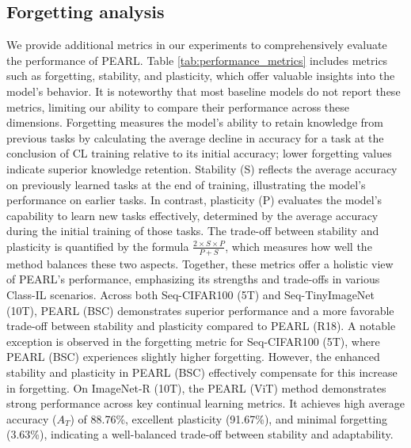 \documentclass[10pt]{article} %
\begin{document}
\subsection{Forgetting analysis}

We provide additional metrics in our experiments to comprehensively evaluate the performance of PEARL. Table \ref{tab:performance_metrics} includes metrics such as forgetting, stability, and plasticity, which offer valuable insights into the model's behavior. It is noteworthy that most baseline models do not report these metrics, limiting our ability to compare their performance across these dimensions. Forgetting measures the model's ability to retain knowledge from previous tasks by calculating the average decline in accuracy for a task at the conclusion of CL training relative to its initial accuracy; lower forgetting values indicate superior knowledge retention. Stability (S) reflects the average accuracy on previously learned tasks at the end of training, illustrating the model’s performance on earlier tasks. In contrast, plasticity (P) evaluates the model's capability to learn new tasks effectively, determined by the average accuracy during the initial training of those tasks. The trade-off between stability and plasticity is quantified by the formula \( \frac{2 \times S \times P}{P + S} \), which measures how well the method balances these two aspects. Together, these metrics offer a holistic view of PEARL’s performance, emphasizing its strengths and trade-offs in various Class-IL scenarios.  Across both Seq-CIFAR100 (5T) and Seq-TinyImageNet (10T), PEARL (BSC) demonstrates superior performance and a more favorable trade-off between stability and plasticity compared to PEARL (R18). A notable exception is observed in the forgetting metric for Seq-CIFAR100 (5T), where PEARL (BSC) experiences slightly higher forgetting. However, the enhanced stability and plasticity in PEARL (BSC) effectively compensate for this increase in forgetting. On ImageNet-R (10T), the PEARL (ViT) method demonstrates strong performance across key continual learning metrics. It achieves high average accuracy ($A_T$) of 88.76\%, excellent plasticity (91.67\%), and minimal forgetting (3.63\%), indicating a well-balanced trade-off between stability and adaptability.
\end{document}
